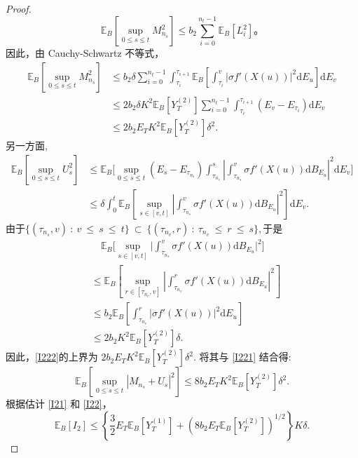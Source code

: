 \begin{proof}
	$$
	\mathbb{E}_B \left[\sup_{0 \leq s \leq t} M_{n_s}^2\right] \leq b_2 \sum_{i=0}^{n_t-1} \mathbb{E}_B [L_i^2]。
	$$
	因此，由 Cauchy-Schwartz 不等式，
	\begin{align}
		\mathbb{E}_B\left[\sup_{0\leq s\leq t}M_{n_s}^2\right] 
		&\leq b_2\delta\sum_{i=0}^{n_t-1}\int_{\tau_i}^{\tau_{i+1}}\mathbb{E}_B
		\left[\int_{\tau_i}^{v}\left|\sigma f'(X(u))\right|^2\mathrm{d}E_{u}\right]
		\mathrm{d}E_{v} \nonumber \\
		&\leq2b_2\delta K^2\mathbb{E}_B[Y_T^{(2)}]\sum_{i=0}^{n_t-1}\int_{\tau_i}^
		{\tau_{i+1}}(E_{v}-E_{\tau_i})\mathrm{d}E_{v} \nonumber \\
		&\leq 2b_2E_TK^2\mathbb{E}_B[Y_T^{(2)}]\delta^2. \label{I221}
	\end{align}
	另一方面, 
	\begin{align}
	\mathbb{E}_B\left[\sup_{0\leq s\leq t}U_s^2\right]  
	&\leq\mathbb{E}_B\biggl[\sup_{0\leq s\leq t}(E_s-E_{\tau_{n_s}})\int_{\tau_{n_s}}^s\left|\int_{\tau_{n_s}}^{v}\sigma f'(X(u))\mathrm{d}B_{E_{u}}\right|^2\mathrm{d}E_{v}\biggr] \nonumber \\ &\leq\delta\int_0^t\mathbb{E}_B\left[\sup_{s\in[v,t]}\left|\int_{\tau_{n_s}}^{v}\sigma f'(X(u))\mathrm{d}B_{E_{u}}\right|^2\right]\mathrm{d}E_{v}.\label{I222}
	\end{align}
	由于$\{(\tau_{n_s},v)~:~v~\leq~s~\leq~t\}~\subset~\{(\tau_{n_{v}},r)~:~\tau_{n_{v}}~\leq~r~\leq~s\},$于是
	\begin{align*}
	&\quad\mathbb{E}_B\Big[\sup_{s\in[v,t]}\Big|\int_{\tau_{n_{s}}}^{v}\sigma f'(X(u))\mathrm{d}B_{E_{u}}\Big|^2\Big]  \\
	&\le \mathbb{E}_B\left[\sup_{r\in[\tau_{n_{v}},v]}\left|\int_{\tau_{n_{v}}}^r\sigma f'(X(u))\mathrm{d}B_{E_{u}}\right|^2\right] \\
	&\leq b_2\mathbb{E}_B\left[\int_{\tau_{n_{v}}}^{r}\left|\sigma f'(X(u))\right|^2\mathrm{d}E_{u}\right]\\
	&\leq 2b_2K^2\mathbb{E}_B[Y_T^{(2)}]\delta.
	\end{align*}
	因此，\cref{I222}的上界为  $2b_2E_TK^2\mathbb{E}_B[Y_T^{(2)}]\delta^2.$ 将其与 \cref{I221} 结合得:
	\begin{equation}\label{I22}
					\mathbb{E}_B\left[\sup_{0\leq s\leq t}|M_{n_s}+U_s|^2\right] 
		\leq 8b_2E_TK^2\mathbb{E}_B[Y_T^{(2)}]\delta^2. 
	\end{equation}
	根据估计 \cref{I21} 和 \cref{I22}，
	\begin{equation}\label{I2}
		\mathbb{E}_B[I_2] 
		\leq \left\{\frac{3}{2}E_T\mathbb{E}_B[Y_T^{(1)}]+(8b_2E_T\mathbb{E}_B[Y_T^{(2)}])^{1/2}\right\}K\delta. 
	\end{equation}
	

\end{proof}
